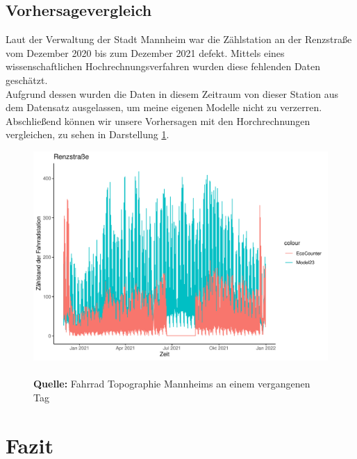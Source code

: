 \documentclass[a4paper,12pt]{thesis}
\newcommand*{\captionsource}[2]{%
	\caption[{#1}]{%
		#1%
		\\\hspace{\linewidth}%
		\textbf{Quelle:} #2%
	}%
}
\begin{document}
\section{Vorhersagevergleich}

Laut der Verwaltung der Stadt Mannheim war die Zählstation an der Renzstraße vom Dezember 2020 bis zum Dezember 2021 defekt. Mittels eines wissenschaftlichen Hochrechnungsverfahren wurden diese fehlenden Daten geschätzt.\\ 
Aufgrund dessen wurden die Daten in diesem Zeitraum von dieser Station aus dem Datensatz ausgelassen, um meine eigenen Modelle nicht zu verzerren. Abschließend können wir unsere Vorhersagen mit den Horchrechnungen vergleichen, zu sehen in Darstellung \ref{Forecast2}.


\begin{figure}[!ht]
	\centering
	\includegraphics[width=\textwidth]{Plots/Renzstrasse.pdf}
	\captionsource{}{
		Fahrrad Topographie Mannheims an einem vergangenen Tag
	}
	\label{Forecast2}
\end{figure}

\chapter{Fazit}
\end{document}
